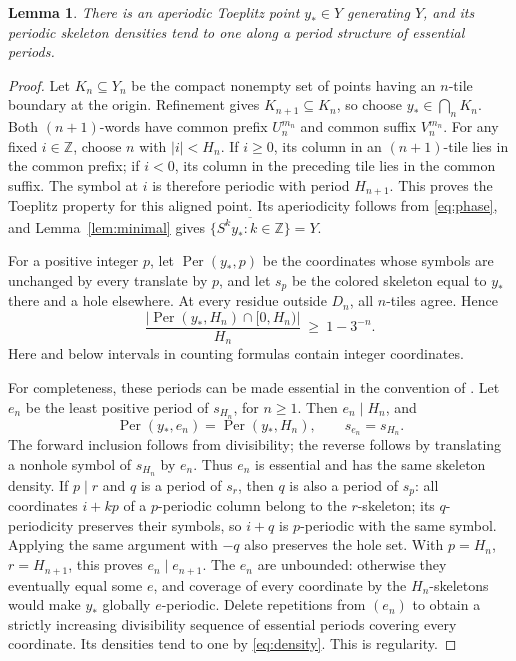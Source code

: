 \documentclass[11pt]{article}
\newtheorem{lemma}[theorem]{Lemma}
\newcommand{\Z}{\mathbb Z}
\newcommand{\Per}{\operatorname{Per}}
\begin{document}
\begin{lemma}\label{lem:toeplitz}
There is an aperiodic Toeplitz point $y_*\in Y$ generating $Y$, and its periodic skeleton densities tend to one along a period structure of essential periods.
\end{lemma}
\begin{proof}
Let $K_n\subseteq Y_n$ be the compact nonempty set of points having an $n$-tile boundary at the origin. Refinement gives $K_{n+1}\subseteq K_n$, so choose $y_*\in\bigcap_n K_n$.
Both $(n+1)$-words have common prefix $U_n^{m_n}$ and common suffix $V_n^{m_n}$. For any fixed $i\in\Z$, choose $n$ with $|i|<H_n$. If $i\geq0$, its column in an $(n+1)$-tile lies in the common prefix; if $i<0$, its column in the preceding tile lies in the common suffix. The symbol at $i$ is therefore periodic with period $H_{n+1}$. This proves the Toeplitz property for this aligned point. Its aperiodicity follows from \eqref{eq:phase}, and Lemma~\ref{lem:minimal} gives $\overline{\{S^ky_*:k\in\Z\}}=Y$.

For a positive integer $p$, let $\Per(y_*,p)$ be the coordinates whose symbols are unchanged by every translate by $p$, and let $s_p$ be the colored skeleton equal to $y_*$ there and a hole elsewhere. At every residue outside $D_n$, all $n$-tiles agree. Hence
\begin{equation}\label{eq:density}
 \frac{|\Per(y_*,H_n)\cap[0,H_n)|}{H_n}\ \geq\ 1-3^{-n}.
\end{equation}
Here and below intervals in counting formulas contain integer coordinates.

For completeness, these periods can be made essential in the convention of \cite[Section 6.1]{KJ}. Let $e_n$ be the least positive period of $s_{H_n}$, for $n\geq1$. Then $e_n\mid H_n$, and
\[
 \Per(y_*,e_n)=\Per(y_*,H_n),\qquad s_{e_n}=s_{H_n}.
\]
The forward inclusion follows from divisibility; the reverse follows by translating a nonhole symbol of $s_{H_n}$ by $e_n$. Thus $e_n$ is essential and has the same skeleton density.
If $p\mid r$ and $q$ is a period of $s_r$, then $q$ is also a period of $s_p$: all coordinates $i+kp$ of a $p$-periodic column belong to the $r$-skeleton; its $q$-periodicity preserves their symbols, so $i+q$ is $p$-periodic with the same symbol. Applying the same argument with $-q$ also preserves the hole set. With $p=H_n$, $r=H_{n+1}$, this proves $e_n\mid e_{n+1}$.
The $e_n$ are unbounded: otherwise they eventually equal some $e$, and coverage of every coordinate by the $H_n$-skeletons would make $y_*$ globally $e$-periodic. Delete repetitions from $(e_n)$ to obtain a strictly increasing divisibility sequence of essential periods covering every coordinate. Its densities tend to one by \eqref{eq:density}. This is regularity.
\end{proof}
\end{document}
